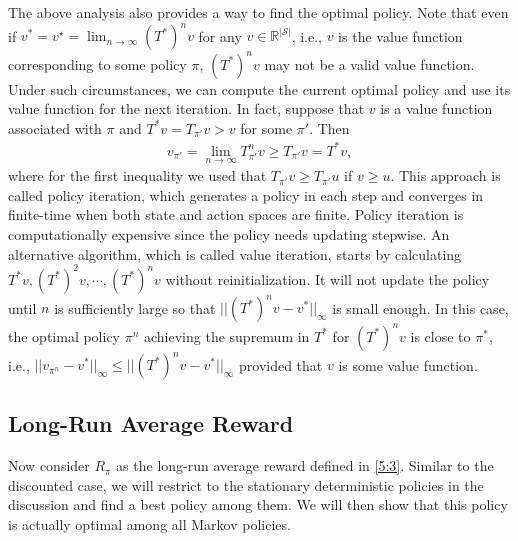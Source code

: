 \documentclass[letterpaper,11pt,openright,openany]{book}
\numberwithin{equation}{section}
\theoremstyle{plain}
\theoremstyle{definition}
\def\R{{\mathbb R}}
\def\R{{\mathbb R}}
\def\S{{\mathcal S}}
\begin{document}
The above analysis also provides a way to find the optimal policy. 
Note that even if $v^*=v^\star=\lim_{n\to\infty}{(T^*)}^nv$ for any $v\in\R^{|\S|}$, i.e., $v$ is the value function corresponding to some policy $\pi$, ${(T^*)}^nv$ may not be a valid value function. Under such circumstances, we can compute the current optimal policy and use its value function for the next iteration. In fact, suppose that $v$ is a value function associated with $\pi$ and $T^*v = T_{\pi'}v>v$ for some $\pi'$. Then
\begin{align*}
v_{\pi'} = \lim_{n\to\infty}T^n_{\pi'}v\geq T_{\pi'}v=T^*v,
\end{align*}
where for the first inequality we used that $T_{\pi'}v\geq T_{\pi'}u$ if $v\geq u$. This approach is called policy iteration, which generates a policy in each step and converges in finite-time when both state and action spaces are finite. 
Policy iteration is computationally expensive since the policy needs updating stepwise. An alternative algorithm, which is called value iteration, starts by calculating $T^*v, ({T^*})^2v,\cdots, ({T^*})^nv$ without reinitialization. It will not update the policy until $n$ is sufficiently large so that $||({T^*})^nv-v^*||_\infty$ is small enough. In this case, the optimal policy $\pi^n$ achieving the supremum in $T^*$ for $({T^*})^nv$ is close to $\pi^*$, i.e., $||v_{\pi^n}-v^*||_\infty\leq ||({T^*})^nv-v^*||_\infty$ provided that $v$ is some value function.   


\subsection{Long-Run Average Reward}

Now consider $R_\pi$ as the long-run average reward defined in \eqref{5:3}.  Similar to the discounted case, we will restrict to the stationary deterministic policies in the discussion and find a best policy among them. We will then show that this policy is actually optimal among all Markov policies. 
\end{document}
